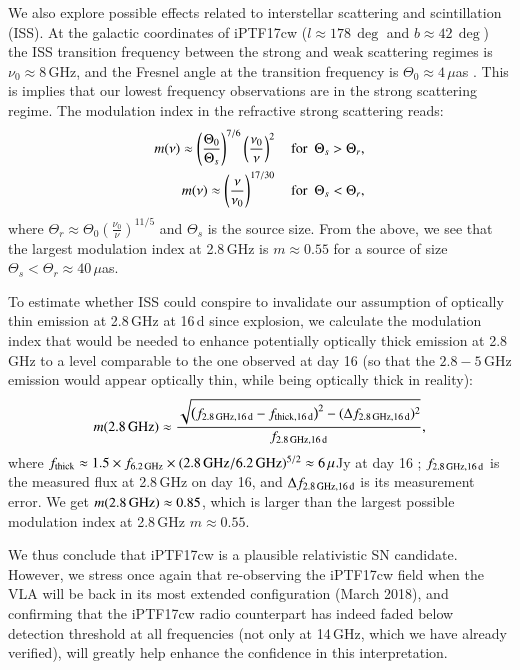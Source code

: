 \documentclass[twocolumn]{emulateapj}
\begin{document}
We also explore possible effects related to interstellar scattering and scintillation (ISS). At the galactic coordinates of iPTF17cw ($l\approx178\,\deg$  and $b\approx42\,\deg$)  the ISS  transition  frequency  between  the strong and weak scattering regimes is $\nu_0\approx 8$\,GHz, and the Fresnel angle at the transition frequency is $\Theta_0\approx 4\,\mu$as \citep{Goodman1997,Walker2001}. This is implies that our lowest frequency observations  are  in  the  strong  scattering  regime. The modulation index in the refractive strong scattering reads: 
\begin{eqnarray}
m(\nu)\approx  \left(\frac{\Theta_0}{\Theta_s}\right)^{7/6}\left(\frac{\nu_0}{\nu}\right)^{2}~~~~{\rm for}~~\Theta_s>\Theta_r,\\
m(\nu)\approx \left(\frac{\nu}{\nu_0}\right)^{17/30}~~~~{\rm for}~~\Theta_s<\Theta_r,
\end{eqnarray}
where $\Theta_r\approx \Theta_0\left(\frac{\nu_0}{\nu}\right)^{11/5}$ and $\Theta_s$ is the source size. From the above, we see that the largest modulation index at 2.8\,GHz is $m\approx 0.55$ for a source of size $\Theta_s<\Theta_r\approx 40\,\mu$as.

To estimate whether ISS could conspire to invalidate our assumption of optically thin emission at 2.8\,GHz at 16\,d since explosion, we calculate the modulation index that would be needed to enhance potentially optically thick emission at 2.8\,GHz to a level comparable to the one observed at day 16 (so that the $2.8-5$\,GHz emission would appear optically thin, while being optically thick in reality):
\begin{equation}
m({\rm 2.8\,GHz)}\approx \frac{\sqrt{\left(f_{\rm 2.8\,GHz, 16\,d}-f_{\rm thick, 16\,d}\right)^2-(\Delta f_{\rm 2.8\,GHz, 16\,d})^2}}{f_{\rm 2.8\,GHz, 16\,d}},
\end{equation}
where $f_{\rm thick}\approx 1.5\times f_{\rm 6.2\,GHz}\times(2.8\,{\rm GHz}/6.2\,{\rm GHz})^{5/2}\approx 6\,\mu$Jy at day 16 \citep[see][for the 1.5 correction factor applied here]{Chevalier1998}; $f_{\rm 2.8\,GHz, 16\,d}$ is the measured flux at 2.8\,GHz on day 16, and $\Delta f_{\rm 2.8\,GHz, 16\,d}$ is its measurement error. We get $m({\rm 2.8\,GHz})\approx 0.85$, which is larger than the largest possible modulation index at 2.8\,GHz $m\approx 0.55$. 

We thus conclude that iPTF17cw is a plausible relativistic SN candidate. However, we stress once again that re-observing the  iPTF17cw field when the VLA will be back in its most extended configuration (March 2018), and confirming that the iPTF17cw radio counterpart has indeed faded below detection threshold at all frequencies (not only at 14\,GHz, which we have already verified), will greatly help enhance the confidence in this interpretation. 
\end{document}
